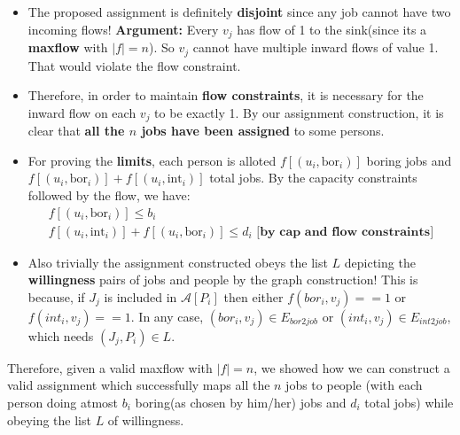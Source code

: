 \documentclass[11pt, fleqn]{article}
\begin{document}
\begin{itemize}
    \begin{itemize}
        \item The proposed assignment is definitely \textbf{disjoint} since any job cannot have two incoming flows! \textbf{Argument: } Every $v_j$ has flow of 1 to the sink(since its a \textbf{maxflow} with $|f|=n$). So $v_j$ cannot have multiple inward flows of value 1. That would violate the flow constraint.
        
        \item Therefore, in order to maintain \textbf{flow constraints}, it is necessary for the inward flow on each $v_j$ to be exactly 1. By our assignment construction, it is clear that \textbf{all the $n$ jobs have been assigned} to some persons.
        
        \item For proving the \textbf{limits}, each person is alloted $f[(u_i,\text{bor}_i)]$ boring jobs and $f[(u_i,\text{bor}_i)] + f[(u_i,\text{int}_i)]$ total jobs. By the capacity constraints followed by the flow, we have: 
        \begin{equation*}
            \begin{gathered}
                f[(u_i,\text{bor}_i)] \leq b_i\\
                f[(u_i,\text{int}_i)] + f[(u_i,\text{bor}_i)] \leq d_i \textbf{ [by cap and flow constraints]}
            \end{gathered}
        \end{equation*}
        
        \item Also trivially the assignment constructed obeys the list $L$ depicting the \textbf{willingness} pairs of jobs and people by the graph construction! This is because, if $J_j$ is included in $\mathcal{A}[P_i]$ then either $f(bor_i,v_j)==1$ or $f(int_i,v_j)==1$. In any case, $(bor_i,v_j) \in E_{bor2job}$ or $(int_i,v_j) \in E_{int2job}$, which needs $(J_j,P_i) \in L$.
    \end{itemize}
    
    Therefore, given a valid maxflow with $|f|=n$, we showed how we can construct a valid assignment which successfully maps all the $n$ jobs to people (with each person doing atmost $b_i$ boring(as chosen by him/her) jobs and $d_i$ total jobs) while obeying the list $L$ of willingness.
\end{itemize}
\end{document}
